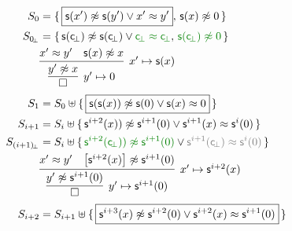 \begin{align*}
S_0 &= \{\, \boxed{\msucc(x') \mNE \msucc (y') \lor x' \mEQ y'}, \, \msucc(x)\mNE 0 \, \} 
\\
S_{0\!_\bot} &= \{\, \msucc(\consbot) \mNE \msucc (\consbot) \lor{\colHi\consbot \mEQ \consbot}, \, {\colHi \msucc(\consbot)\mNE 0} \, \}
\\
&\infer[x'\mapsto \msucc(x)
]{ 
	\infer[y'\mapsto 0]{\emptyclause}{ y'\mNE x }
}
{x' \mEQ y' & \msucc(x)\mNE x}
\\
S_1 &= S_0\disjointunion \{\,
\boxed{\msucc(\msucc(x)) \mNE \msucc(0) \lor \msucc(x) \mEQ 0} \,
\} 
\\
S_{i+1} &= S_i\disjointunion \{\,
\msucc^{i+2}(x)) \mNE \msucc^{i+1} (0) \lor \msucc^{i+1}(x) \mEQ \msucc^i(0) \,
\} 
\\
S_{(i+1)\!_\bot} &= S_i\disjointunion \{\,
{\colHi \msucc^{i+2}(\consbot)) \mNE \msucc^{i+1} (0)} \lor {\colG\msucc^{i+1}(\consbot) \mEQ \msucc^i(0)} \,
\} 
\\
&\infer[x'\mapsto \msucc^{i+2}(x)
]{ 
	\infer[y'\mapsto \msucc^{i+1}(0)]{\emptyclause}{ y'\mNE \msucc^{i+1}(0) }
}
{x' \mEQ y' & \left[\msucc^{i+2}(x)\right]\mNE \msucc^{i+1}(0)}
\\
S_{i+2} &= S_{i+1}\disjointunion \{\,
\boxed{\msucc^{i+3}(x) \mNE \msucc^{i+2}(0) \lor \msucc^{i+2}(x) \mEQ \msucc^{i+1}(0)} \,
\} 
\end{align*}




